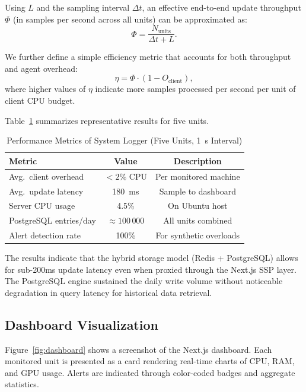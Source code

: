 \documentclass[conference]{IEEEtran}
\begin{document}
Using $L$ and the sampling interval $\Delta t$, an effective end-to-end update throughput $\Phi$ (in samples per second across all units) can be approximated as:
\begin{equation}
  \Phi = \frac{N_{\text{units}}}{\Delta t + L}.
\end{equation}

We further define a simple efficiency metric that accounts for both throughput and agent overhead:
\begin{equation}
  \eta = \Phi \cdot (1 - O_{\text{client}}),
\end{equation}
where higher values of $\eta$ indicate more samples processed per second per unit of client CPU budget.

Table~\ref{tab:performance} summarizes representative results for five units.

\begin{table}[H]
  \centering
  \caption{Performance Metrics of System Logger (Five Units, 1~s Interval)}
  \begin{tabular}{lcc}
    \toprule
    \textbf{Metric} & \textbf{Value} & \textbf{Description} \\
    \midrule
    Avg.\ client overhead & $< 2\%$ CPU & Per monitored machine \\
    Avg.\ update latency  & 180~ms     & Sample to dashboard \\
    Server CPU usage      & 4.5\%      & On Ubuntu host \\
    PostgreSQL entries/day  & $\approx 100\,000$ & All units combined \\
    Alert detection rate  & 100\%      & For synthetic overloads \\
    \bottomrule
  \end{tabular}
  \label{tab:performance}
\end{table}

The results indicate that the hybrid storage model (Redis + PostgreSQL) allows for sub-200ms update latency even when proxied through the Next.js SSP layer. The PostgreSQL engine sustained the daily write volume without noticeable degradation in query latency for historical data retrieval.

\subsection{Dashboard Visualization}

Figure~\ref{fig:dashboard} shows a screenshot of the Next.js dashboard. Each monitored unit is presented as a card rendering real-time charts of CPU, RAM, and GPU usage. Alerts are indicated through color-coded badges and aggregate statistics.
\end{document}

